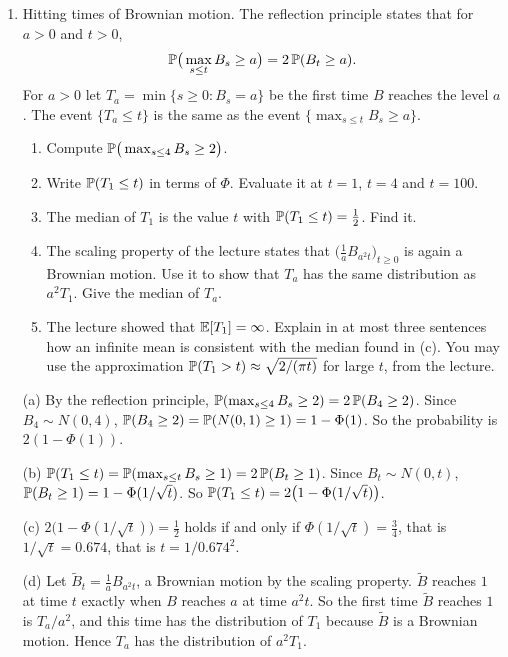 \begin{enumerate}[resume*=quiz]
\item Hitting times of Brownian motion. The reflection principle states that for $a>0$ and $t>0$,
\[
\mathbb{P}\big(\max_{s\le t}B_s\ge a\big)=2\,\mathbb{P}(B_t\ge a).
\]
For $a>0$ let $T_a=\min\{s\ge0:B_s=a\}$ be the first time $B$ reaches the level $a$. The event $\{T_a\le t\}$ is the same as the event $\{\max_{s\le t}B_s\ge a\}$.
\begin{enumerate}[label=(\alph*),leftmargin=2em]
\item Compute $\mathbb{P}\big(\max_{s\le4}B_s\ge2\big)$.
\item Write $\mathbb{P}(T_1\le t)$ in terms of $\Phi$. Evaluate it at $t=1$, $t=4$ and $t=100$.
\item The median of $T_1$ is the value $t$ with $\mathbb{P}(T_1\le t)=\tfrac12$. Find it.
\item The scaling property of the lecture states that $\big(\tfrac1aB_{a^2t}\big)_{t\ge0}$ is again a Brownian motion. Use it to show that $T_a$ has the same distribution as $a^2T_1$. Give the median of $T_a$.
\item The lecture showed that $\mathbb{E}[T_1]=\infty$. Explain in at most three sentences how an infinite mean is consistent with the median found in (c). You may use the approximation $\mathbb{P}(T_1>t)\approx\sqrt{2/(\pi t)}$ for large $t$, from the lecture.
\end{enumerate}
\begin{solution}
(a) By the reflection principle, $\mathbb{P}(\max_{s\le4}B_s\ge2)=2\,\mathbb{P}(B_4\ge2)$. Since $B_4\sim N(0,4)$, $\mathbb{P}(B_4\ge2)=\mathbb{P}(N(0,1)\ge1)=1-\Phi(1)$. So the probability is $2(1-\Phi(1))$.

(b) $\mathbb{P}(T_1\le t)=\mathbb{P}(\max_{s\le t}B_s\ge1)=2\,\mathbb{P}(B_t\ge1)$. Since $B_t\sim N(0,t)$, $\mathbb{P}(B_t\ge1)=1-\Phi(1/\sqrt t)$. So
$\mathbb{P}(T_1\le t)=2\big(1-\Phi(1/\sqrt t)\big)$.

(c) $2\big(1-\Phi(1/\sqrt t)\big)=\tfrac12$ holds if and only if $\Phi(1/\sqrt t)=\tfrac34$, that is $1/\sqrt t=0.674$, that is $t=1/0.674^2$.

(d) Let $\tilde B_t=\tfrac1aB_{a^2t}$, a Brownian motion by the scaling property. $\tilde B$ reaches $1$ at time $t$ exactly when $B$ reaches $a$ at time $a^2t$. So the first time $\tilde B$ reaches $1$ is $T_a/a^2$, and this time has the distribution of $T_1$ because $\tilde B$ is a Brownian motion. Hence $T_a$ has the distribution of $a^2T_1$.


\end{solution}
\end{enumerate}
